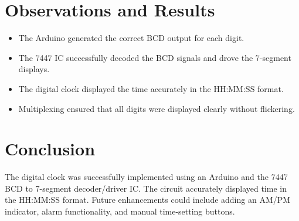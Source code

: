 \documentclass[journal]{IEEEtran}
\begin{document}
\section{Observations and Results}
\begin{itemize}
    \item The Arduino generated the correct BCD output for each digit.
    \item The 7447 IC successfully decoded the BCD signals and drove the 7-segment displays.
    \item The digital clock displayed the time accurately in the HH:MM:SS format.
    \item Multiplexing ensured that all digits were displayed clearly without flickering.
\end{itemize}

\section{Conclusion}
The digital clock was successfully implemented using an Arduino and the 7447 BCD to 7-segment decoder/driver IC. The circuit accurately displayed time in the HH:MM:SS format. Future enhancements could include adding an AM/PM indicator, alarm functionality, and manual time-setting buttons.
\end{document}
